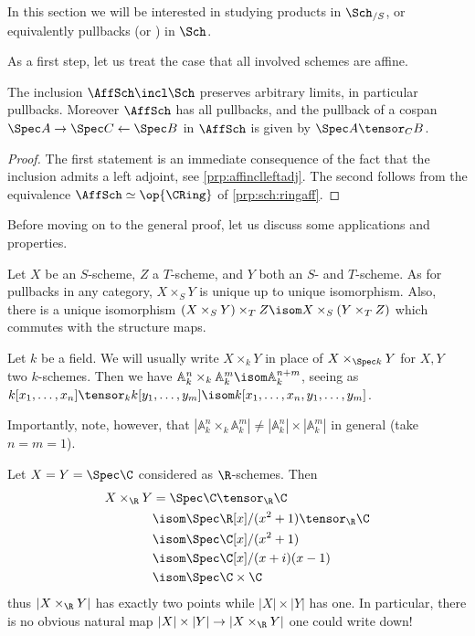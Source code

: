 \documentclass[wip, algebra]{bsteffan-lecturenotes}
\newcommand{\A}{\mathbb{A}}
\begin{document}
In this section we will be interested in studying products in $\Sch_{/ S}$, or equivalently pullbacks (or ) in $\Sch$.

As a first step, let us treat the case that all involved schemes are affine.
\begin{proposition}
	The inclusion $\AffSch \incl \Sch$ preserves arbitrary limits, in particular pullbacks.
	Moreover $\AffSch$ has all pullbacks, and the pullback of a cospan $\Spec A \rightarrow \Spec C \leftarrow \Spec B$ in $\AffSch$ is given by $\Spec A \tensor_C B$.
\end{proposition}
\begin{proof}
	The first statement is an immediate consequence of the fact that the inclusion admits a left adjoint, see \cref{prp:affinclleftadj}.
	The second follows from the equivalence $\AffSch \simeq \op{\CRing}$ of \cref{prp:sch:ringaff}.
\end{proof}
Before moving on to the general proof, let us discuss some applications and properties.
\begin{remark}
	Let $X$ be an $S$-scheme, $Z$ a $T$-scheme, and $Y$ both an $S$- and $T$-scheme.
	As for pullbacks in any category, $X \times_S Y$ is unique up to unique isomorphism.
	Also, there is a unique isomorphism $(X \times_S Y) \times_T Z \isom X \times_S (Y \times_T Z)$ which commutes with the structure maps.
\end{remark}
\begin{example}
	Let $k$ be a field.
	We will usually write $X \times_k Y$ in place of $X \times_{\Spec k} Y$ for $X, Y$ two $k$-schemes.
	Then we have $\A^n_k \times_k \A^m_k \isom \A^{n + m}_k$, seeing as $k[x_1, \ldots, x_n] \tensor_k k[y_1, \ldots, y_m] \isom k[x_1, \ldots, x_n, y_1, \ldots, y_m]$.

	Importantly, note, however, that $|\A^n_k \times_k \A^m_k| \neq |\A^n_k| \times |\A^m_k|$ in general (take $n = m = 1$).
\end{example}
\begin{example}\label{epl:sch:fpR}
	Let $X = Y = \Spec \C$ considered as $\R$-schemes.
	Then
	\begin{align*}
		X \times_\R Y &= \Spec \C \tensor_\R \C \\
					  &\isom \Spec \R[x] / (x^2 + 1) \tensor_\R \C \\
					  &\isom \Spec \C[x] / (x^2 + 1) \\
					  &\isom \Spec \C[x] / (x + i)(x - 1) \\
					  &\isom \Spec \C \times \C
	\end{align*}
	thus $|X \times_\R Y|$ has exactly two points while $|X| \times |Y|$ has one.
	In particular, there is no obvious natural map $|X| \times |Y| \to |X \times_\R Y|$ one could write down!
\end{example}
\end{document}
